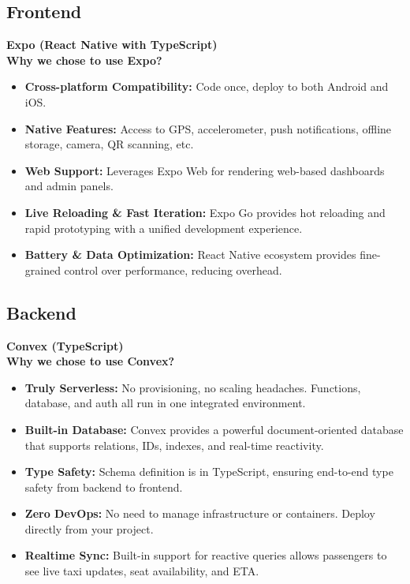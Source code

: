 \documentclass[a4paper,12pt]{article}
\begin{document}
\subsection{Frontend}
\textbf{Expo (React Native with TypeScript)}\\
\textbf{Why we chose to use Expo?}
\begin{itemize}
    \item \textbf{Cross-platform Compatibility:} Code once, deploy to both Android and iOS.
    \item \textbf{Native Features:} Access to GPS, accelerometer, push notifications, offline storage, camera, QR scanning, etc.
    \item \textbf{Web Support:} Leverages Expo Web for rendering web-based dashboards and admin panels.
    \item \textbf{Live Reloading \& Fast Iteration:} Expo Go provides hot reloading and rapid prototyping with a unified development experience.
    \item \textbf{Battery \& Data Optimization:} React Native ecosystem provides fine-grained control over performance, reducing overhead.
\end{itemize}

\subsection{Backend}
\textbf{Convex (TypeScript)}\\
\textbf{Why we chose to use Convex?}
\begin{itemize}
    \item \textbf{Truly Serverless:} No provisioning, no scaling headaches. Functions, database, and auth all run in one integrated environment.
    \item \textbf{Built-in Database:} Convex provides a powerful document-oriented database that supports relations, IDs, indexes, and real-time reactivity.
    \item \textbf{Type Safety:} Schema definition is in TypeScript, ensuring end-to-end type safety from backend to frontend.
    \item \textbf{Zero DevOps:} No need to manage infrastructure or containers. Deploy directly from your project.
    \item \textbf{Realtime Sync:} Built-in support for reactive queries allows passengers to see live taxi updates, seat availability, and ETA.
\end{itemize}
\end{document}
